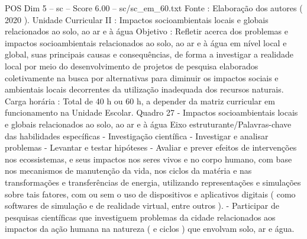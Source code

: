 \begin{textsample}{POS Dim 5 – sc – Score 6.00 – sc/sc\_em\_60.txt}
Fonte : Elaboração dos autores ( 2020 ).
Unidade Curricular II : Impactos socioambientais locais e globais relacionados ao solo, ao ar e à água Objetivo : Refletir acerca dos problemas e impactos socioambientais relacionados ao solo, ao ar e à água em nível local e global, suas principais causas e consequências, de forma a investigar a realidade local por meio do desenvolvimento de projetos de pesquisa elaborados coletivamente na busca por alternativas para diminuir os impactos sociais e ambientais locais decorrentes da utilização inadequada dos recursos naturais.
Carga horária : Total de 40 h ou 60 h, a depender da matriz curricular em funcionamento na Unidade Escolar.
Quadro 27 - Impactos socioambientais locais e globais relacionados ao solo, ao ar e à água Eixo estruturante/Palavras-chave das habilidades específicas - Investigação científica - Investigar e analisar problemas - Levantar e testar hipóteses - Avaliar e prever efeitos de intervenções nos ecossistemas, e seus impactos nos seres vivos e no corpo humano, com base nos mecanismos de manutenção da vida, nos ciclos da matéria e nas transformações e transferências de energia, utilizando representações e simulações sobre tais fatores, com ou sem o uso de dispositivos e aplicativos digitais ( como softwares de simulação e de realidade virtual, entre outros ). - Participar de pesquisas científicas que investiguem problemas da cidade relacionados aos impactos da ação humana na natureza ( e ciclos ) que envolvam solo, ar e água.

\end{textsample}
